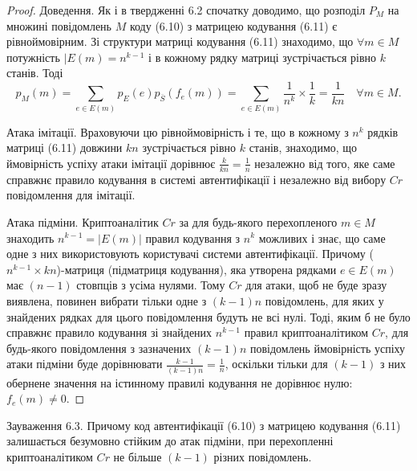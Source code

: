 \begin{proof}
    Доведення. Як і в твердженні 6.2 спочатку доводимо, що розподіл $P_M$ на множині
    повідомлень $M$ коду (6.10) з матрицею кодування (6.11) є рівноймовірним. Зі
    структури матриці кодування (6.11) знаходимо, що $\forall m \in M$ потужність $|E(m) = n^{k-1}$ і
    в кожному рядку матриці зустрічається рівно $k$ станів. Тоді
    \begin{equation*}
        p_M(m)
        = \sum_{e \in E(m)} p_E(e) p_{\overline{S}}(f_e(m))
        = \sum_{e \in E(m)} \frac{1}{n^k} \times \frac{1}{k}
        = \frac{1}{kn}
        \quad \forall m \in M.
    \end{equation*}
    
    Атака імітації. Враховуючи цю рівноймовірність і те, що в кожному з $n^k$
    рядків матриці (6.11) довжини $kn$ зустрічається рівно $k$ станів, знаходимо, що
    ймовірність успіху атаки імітації дорівнює $\frac{k}{kn} = \frac{1}{n}$ незалежно від того, яке саме
    справжнє правило кодування в системі автентифікації і незалежно від вибору $Cr$ повідомлення для імітації.
    
    Атака підміни. Криптоаналітик $Cr$ за для будь-якого перехопленого $m \in M$
    знаходить $n^{k - 1} = |E(m)|$ правил кодування з $n^k$ можливих і знає, що саме одне з
    них використовують користувачі системи автентифікації. Причому ($n^{k - 1} \times kn$)-матриця
    (підматриця кодування), яка утворена рядками $e \in E(m)$ має $(n - 1)$ стовпців
    з усіма нулями. Тому $Cr$ для атаки, щоб не буде зразу виявлена, повинен вибрати
    тільки одне з $(k - 1)n$ повідомлень, для яких у знайдених рядках для цього
    повідомлення будуть не всі нулі. Тоді, яким б не було справжнє правило
    кодування зі знайдених $n^{k-1}$ правил криптоаналітиком $Cr$, для будь-якого
    повідомлення з зазначених $(k - 1)n$ повідомлень ймовірність успіху атаки
    підміни буде дорівнювати $\frac{k - 1}{(k - 1)n} = \frac{1}{n}$, оскільки тільки для $(k - 1)$ з них обернене
    значення на істинному правилі кодування не дорівнює нулю: $f_e(m) \neq 0$.
\end{proof}

\begin{remark}
    Зауваження 6.3. Причому код автентифікації (6.10) з матрицею кодування
    (6.11) залишається безумовно стійким до атак підміни, при перехопленні
    криптоаналітиком $Cr$ не більше $(k - 1)$ різних повідомлень.
\end{remark}

